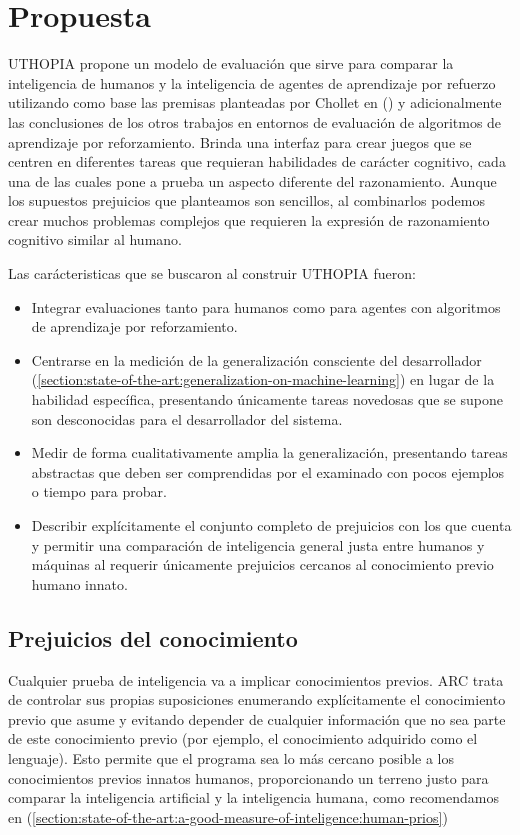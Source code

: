 \chapter{Propuesta}\label{chapter:proposal}

UTHOPIA propone un modelo de evaluación que sirve para comparar la inteligencia de humanos y la inteligencia de agentes de aprendizaje por refuerzo utilizando como base las premisas planteadas por Chollet en (\cite{chollet2019measure}) y adicionalmente las conclusiones de los otros trabajos en entornos de evaluación de algoritmos de aprendizaje por reforzamiento. Brinda una interfaz para crear juegos que se centren en diferentes tareas que requieran habilidades de carácter cognitivo, cada una de las cuales pone a prueba un aspecto diferente del razonamiento. Aunque los supuestos prejuicios que planteamos son sencillos, al combinarlos podemos crear muchos problemas complejos que requieren la expresión de razonamiento cognitivo similar al humano.

Las carácteristicas que se buscaron al construir UTHOPIA fueron:

\begin{itemize}
    \item Integrar evaluaciones tanto para humanos como para agentes con algoritmos de aprendizaje por reforzamiento.
    \item Centrarse en la medición de la generalización consciente del desarrollador (\ref{section:state-of-the-art:generalization-on-machine-learning}) en lugar de la habilidad específica, presentando únicamente tareas novedosas que se supone son desconocidas para el desarrollador del sistema.
    \item Medir de forma cualitativamente amplia la generalización, presentando tareas abstractas que deben ser comprendidas por el examinado con pocos ejemplos o tiempo para probar.
    \item Describir explícitamente el conjunto completo de prejuicios con los que cuenta y permitir una comparación de inteligencia general justa entre humanos y máquinas al requerir únicamente prejuicios cercanos al conocimiento previo humano innato.
\end{itemize}

\section{Prejuicios del conocimiento} 

Cualquier prueba de inteligencia va a implicar conocimientos previos. ARC trata de controlar sus propias suposiciones enumerando explícitamente el conocimiento previo que asume y evitando depender de cualquier información que no sea parte de este conocimiento previo (por ejemplo, el conocimiento adquirido como el lenguaje). Esto permite que el programa sea lo más cercano posible a los conocimientos previos innatos humanos, proporcionando un terreno justo para comparar la inteligencia artificial y la inteligencia humana, como recomendamos en (\ref{section:state-of-the-art:a-good-measure-of-inteligence:human-prios})

